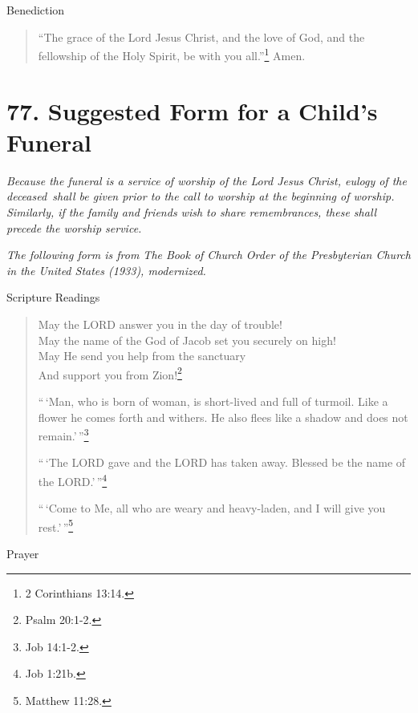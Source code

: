 \documentclass[
]{book}
\begin{document}
Benediction

\begin{quote}
``The grace of the Lord Jesus Christ, and the love of God, and the fellowship of the Holy Spirit, be with you all.''\footnote{2 Corinthians 13:14.} Amen.
\end{quote}

\hypertarget{suggested-form-for-a-childs-funeral}{%
\section*{77. Suggested Form for a Child's Funeral}\label{suggested-form-for-a-childs-funeral}}

\protect\hypertarget{chapter-slug-77-suggested-form-for-a-childs-funeral}{\href{}{}}

\protect\hypertarget{77}{\href{}{}}\emph{Because the funeral is a service of worship of the Lord Jesus Christ, eulogy of the deceased~shall be given prior to the call to worship at the beginning of worship. Similarly, if the family and friends wish to share remembrances, these shall precede the worship service.}

\emph{The following form is from The Book of Church Order of the Presbyterian Church in the United States (1933), modernized.}

Scripture Readings

\begin{quote}
May the LORD answer you in the day of trouble!\\
May the name of the God of Jacob set you securely on high!\\
May He send you help from the sanctuary\\
And support you from Zion!\footnote{Psalm 20:1-2.}

``\,`Man, who is born of woman, is short-lived and full of turmoil. Like a flower he comes forth and withers. He also flees like a shadow and does not remain.'\,''\footnote{Job 14:1-2.}

``\,`The LORD gave and the LORD has taken away. Blessed be the name of the LORD.'\,''\footnote{Job 1:21b.}

``\,`Come to Me, all who are weary and heavy-laden, and I will give you rest.'\,''\footnote{Matthew 11:28.}
\end{quote}

Prayer
\end{document}
